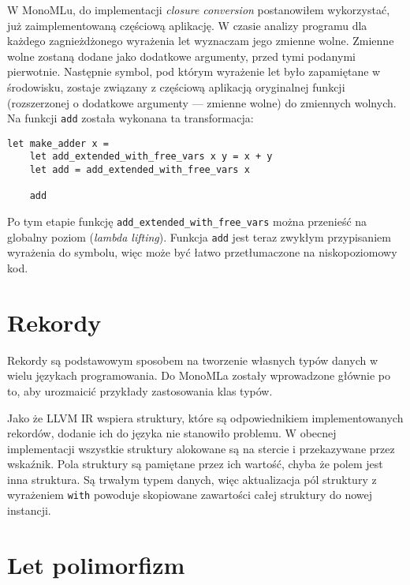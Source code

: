 \documentclass[declaration,shortabstract]{iithesis}
\begin{document}
W MonoMLu, do implementacji \textit{closure conversion} postanowiłem wykorzystać,
już zaimplementowaną częściową aplikację. W czasie analizy programu dla każdego 
zagnieżdżonego wyrażenia let wyznaczam jego zmienne wolne. Zmienne wolne
zostaną dodane jako dodatkowe argumenty, przed tymi podanymi pierwotnie.
Następnie symbol, pod którym wyrażenie let było zapamiętane w 
środowisku, zostaje związany z częściową aplikacją oryginalnej funkcji 
(rozszerzonej o dodatkowe argumenty --- zmienne wolne) do zmiennych wolnych.
Na funkcji \texttt{add} została wykonana ta transformacja:
\begin{lstlisting}[frame=lines]
let make_adder x = 
    let add_extended_with_free_vars x y = x + y
    let add = add_extended_with_free_vars x

    add
\end{lstlisting}

Po tym etapie funkcję \texttt{add\_extended\_with\_free\_vars} można przenieść 
na globalny poziom (\textit{lambda lifting}). Funkcja \texttt{add} jest teraz zwykłym 
przypisaniem wyrażenia do symbolu, więc może być łatwo przetłumaczone na 
niskopoziomowy kod.




\section{Rekordy}

Rekordy są podstawowym sposobem na tworzenie własnych typów danych w wielu 
językach programowania. Do MonoMLa zostały wprowadzone głównie po to, 
aby urozmaicić przykłady zastosowania klas typów. 

Jako że LLVM IR wspiera struktury, które są odpowiednikiem implementowanych 
rekordów, dodanie ich do języka nie stanowiło problemu. W obecnej 
implementacji 
wszystkie struktury alokowane są na stercie i przekazywane przez wskaźnik.
Pola struktury są pamiętane przez ich wartość, chyba że polem jest inna 
struktura. Są trwałym typem danych, więc aktualizacja pól struktury 
z wyrażeniem \texttt{with} powoduje skopiowane zawartości całej struktury do 
nowej instancji.

\section{Let polimorfizm}
\end{document}
